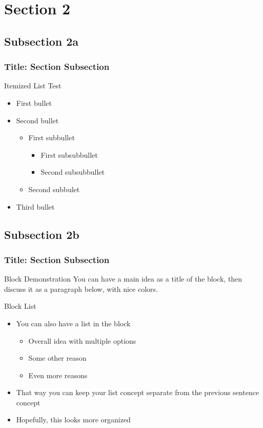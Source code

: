 \documentclass[aspectratio=169]{beamer}
\begin{document}
\section{Section 2}

\subsection{Subsection 2a}

\begin{frame}
\frametitle{Title: Section \thesection Subsection \thesubsection}
Itemized List Test
\begin{itemize}
    \item First bullet
    \item Second bullet
    \begin{itemize}
        \item First subbullet
        \begin{itemize}
            \item First subsubbullet
            \item Second subsubbullet
        \end{itemize}
        \item Second subbulet
    \end{itemize}
    \item Third bullet
\end{itemize}
\end{frame}

\subsection{Subsection 2b}

\begin{frame}
\frametitle{Title: Section \thesection Subsection \thesubsection}
\begin{block}{Block Demonstration}
You can have a main idea as a title of the block, then discuss it as a paragraph below, with nice colors.
\end{block}
\begin{block}{Block List}
    \begin{itemize}
      \item You can also have a list in the block
        \begin{itemize}
          \item Overall idea with multiple options
          \item Some other reason
          \item Even more reasons
        \end{itemize}
      \item That way you can keep your list concept separate from the previous sentence concept
      \item Hopefully, this looks more organized
    \end{itemize}
\end{block}
\end{frame}
\end{document}

